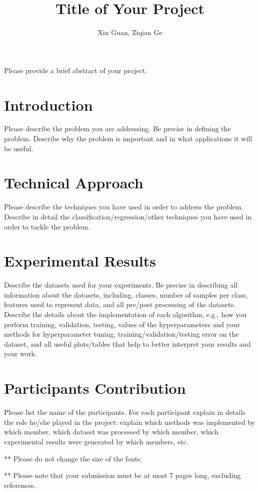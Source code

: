 \documentclass[11.5pt]{article}
\title{Title of Your Project}
\author{Xin Guan, Ziqian Ge}
\date{}
\begin{document}
\maketitle

\abstract
Please provide a brief abstract of your project.

\vspace{2mm}
\section{Introduction}
Please describe the problem you are addressing. Be precise in defining the problem. Describe why the problem is important and in what applications it will be useful.

\section{Technical Approach}
Please describe the techniques you have used in order to address the problem. Describe in detail the classification/regression/other techniques you have used in order to tackle the problem.

\section{Experimental Results}
Describe the datasets used for your experiments. Be precise in describing all information about the datasets, including, classes, number of samples per class, features used to represent data, and all pre/post processing of the datasets.\\
Describe the details about the implementation of each algorithm, e.g., how you perform training, validation, testing, values of the hyperparameters and your methods for hyperparameter tuning, training/validation/testing error on the dataset, and all useful plots/tables that help to better interpret your results and your work.

\section{Participants Contribution}
Please list the name of the participants. For each participant explain in details the role he/she played in the project: explain which methods was implemented by which member, which dataset was processed by which member, which experimental results were generated by which members, etc.

\vspace{10mm}
** Please do not change the size of the fonts.

** Please note that your submission must be at most 7 pages long, excluding references.
\end{document}
